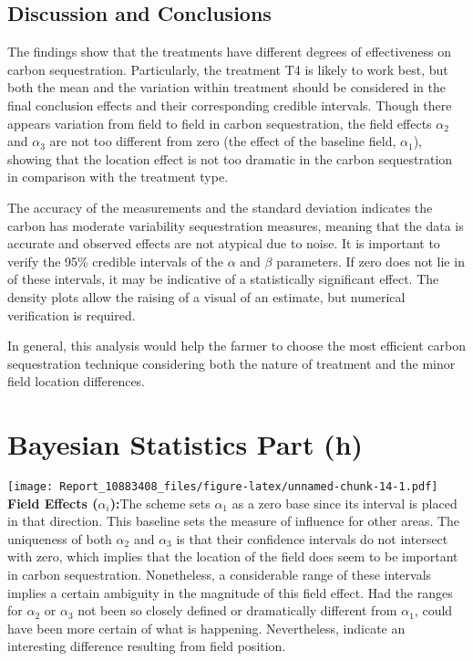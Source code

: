 \documentclass[
]{article}
\begin{document}
\subsection{Discussion and
Conclusions}\label{discussion-and-conclusions}

The findings show that the treatments have different degrees of
effectiveness on carbon sequestration. Particularly, the treatment T4 is
likely to work best, but both the mean and the variation within
treatment should be considered in the final conclusion effects and their
corresponding credible intervals. Though there appears variation from
field to field in carbon sequestration, the field effects \(\alpha_2\)
and \(\alpha_3\) are not too different from zero (the effect of the
baseline field, \(\alpha_1\)), showing that the location effect is not
too dramatic in the carbon sequestration in comparison with the
treatment type.

The accuracy of the measurements and the standard deviation indicates
the carbon has moderate variability sequestration measures, meaning that
the data is accurate and observed effects are not atypical due to noise.
It is important to verify the 95\% credible intervals of the \(\alpha\)
and \(\beta\) parameters. If zero does not lie in of these intervals, it
may be indicative of a statistically significant effect. The density
plots allow the raising of a visual of an estimate, but numerical
verification is required.

In general, this analysis would help the farmer to choose the most
efficient carbon sequestration technique considering both the nature of
treatment and the minor field location differences.

\section{Bayesian Statistics Part (h)}\label{bayesian-statistics-part-h}

\texttt{[image: Report\_10883408\_files/figure-latex/unnamed-chunk-14-1.pdf]}
\textbf{Field Effects (\(\alpha_i\)):}The scheme sets \(\alpha_1\) as a
zero base since its interval is placed in that direction. This baseline
sets the measure of influence for other areas. The uniqueness of both
\(\alpha_2\) and \(\alpha_3\) is that their confidence intervals do not
intersect with zero, which implies that the location of the field does
seem to be important in carbon sequestration. Nonetheless, a
considerable range of these intervals implies a certain ambiguity in the
magnitude of this field effect. Had the ranges for \(\alpha_2\) or
\(\alpha_3\) not been so closely defined or dramatically different from
\(\alpha_1\), could have been more certain of what is happening.
Nevertheless, indicate an interesting difference resulting from field
position.
\end{document}
